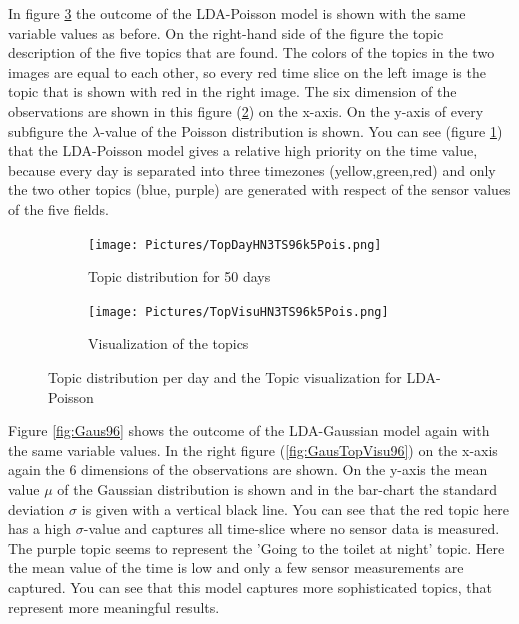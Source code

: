 \documentclass[11pt,a4paper]{article}
\begin{document}
In figure \ref{fig:Pois96} the outcome of the LDA-Poisson model is shown with the same variable values as before. On the right-hand side of the figure the topic description of the five topics that are found. The colors of the topics in the two images are equal to each other, so every red time slice on the left image is the topic that is shown with red in the right image. The six dimension of the observations are shown in this figure (\ref{fig:PoisTopVisu96}) on the x-axis. On the y-axis of every subfigure the $\lambda$-value of the Poisson distribution is shown. You can see (figure \ref{fig:PoisDay96}) that the LDA-Poisson model gives a relative high priority on the time value, because every day is separated into three timezones (yellow,green,red) and only the two other topics (blue, purple) are generated with respect of the sensor values of the five fields.

\begin{figure}
 \centering
 \begin{subfigure}[b]{0.45\linewidth}
  \centering
  \texttt{[image: Pictures/TopDayHN3TS96k5Pois.png]}
  \caption{Topic distribution for 50 days}
  \label{fig:PoisDay96}
 \end{subfigure}
 \begin{subfigure}[b]{0.45\linewidth}
  \centering
  \texttt{[image: Pictures/TopVisuHN3TS96k5Pois.png]}
  \caption{Visualization of the topics}
  \label{fig:PoisTopVisu96}
 \end{subfigure}
 \caption{Topic distribution per day and the Topic visualization for LDA-Poisson}
 \label{fig:Pois96}
\end{figure}


Figure \ref{fig:Gaus96} shows the outcome of the LDA-Gaussian model again with the same variable values. In the right figure (\ref{fig:GausTopVisu96}) on the x-axis again the 6 dimensions of the observations are shown. On the y-axis the mean value $\mu$ of the Gaussian distribution is shown and in the bar-chart the standard deviation $\sigma$ is given with a vertical black line. You can see that the red topic here has a high $\sigma$-value and captures all time-slice where no sensor data is measured. The purple topic seems to represent the 'Going to the toilet at night' topic. Here the mean value of the time is low and only a few sensor measurements are captured. You can see that this model captures more sophisticated topics, that represent more meaningful results.
\end{document}
